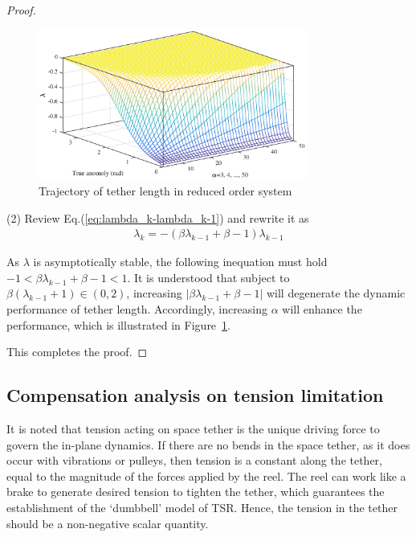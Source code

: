 \documentclass[10pt,onecolumn,draftcls]{IEEEtran}
\begin{document}
\begin{proof}
\begin{figure}[htbp] 
	\centering
\includegraphics[width=250pt]{reducedlength.eps}  
\caption{Trajectory of tether length in reduced order system} \label{fig:graph_reduced_length}
\end{figure} 

  (2) Review Eq.(\ref{eq:lambda_k-lambda_k-1}) and rewrite it as
  \begin{align}
	  \lambda_{k} = -\left(\beta\lambda_{k-1}+\beta-1\right)\lambda_{k-1}
  \end{align}
  
  As $\lambda$ is asymptotically stable, the following inequation must hold$
	-1<\beta\lambda_{k-1}+\beta-1<1$. 
It is understood that subject to $\beta\left(\lambda_{k-1}+1\right)\in(0,2)$, increasing $\left\vert\beta\lambda_{k-1}+\beta-1\right\vert$ will degenerate the dynamic performance of tether length. Accordingly, increasing $\alpha$ will enhance the performance, which is illustrated in Figure~\ref{fig:graph_reduced_length}.


  This completes the proof.\end{proof}

\subsection{Compensation analysis on tension limitation}\label{subsec:Compensation}
It is noted that tension acting on space tether is the unique driving force to govern the in-plane dynamics. If there are no bends in the space tether, as it does occur with vibrations or pulleys, then tension is a constant along the tether, equal to the magnitude of the forces applied by the reel. The reel can work like a brake to generate desired tension to tighten the tether, which guarantees the establishment of the `dumbbell' model of TSR. Hence, the tension in the tether should be a non-negative scalar quantity. 
\end{document}
